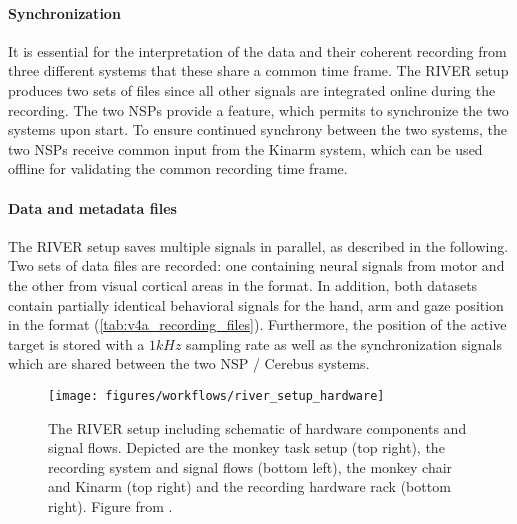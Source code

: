 \paragraph{Synchronization}
It is essential for the interpretation of the data and their coherent recording from three different systems that these share a common time frame. The RIVER setup produces two sets of  files since all other signals are integrated online during the recording. The two NSPs provide a feature, which permits to synchronize the two systems upon start. To ensure continued synchrony between the two systems, the two NSPs receive common input from the Kinarm system, which can be used offline for validating the common recording time frame.

\paragraph{Data and metadata files}
The RIVER setup saves multiple signals in parallel, as described in the following. Two sets of  data files are recorded: one containing neural signals from motor and the other from visual cortical areas in the  format. In addition, both datasets contain partially identical behavioral signals for the hand, arm and gaze position in the  format (\cref{tab:v4a_recording_files}). Furthermore, the position of the active target is stored with a $1kHz$ sampling rate as well as the synchronization signals which are shared between the two NSP / Cerebus systems.



\begin{sidewaysfigure}
 \texttt{[image: figures/workflows/river\_setup\_hardware]}
 \caption[The RIVER setup]{The RIVER setup including schematic of hardware components and signal flows. Depicted are the monkey task setup (top right), the recording system and signal flows (bottom left), the monkey chair and Kinarm (top right) and the recording hardware rack (bottom right). Figure from \citet{deHaan_2018a}.}
 \label{fig:river_setup}
\end{sidewaysfigure}


